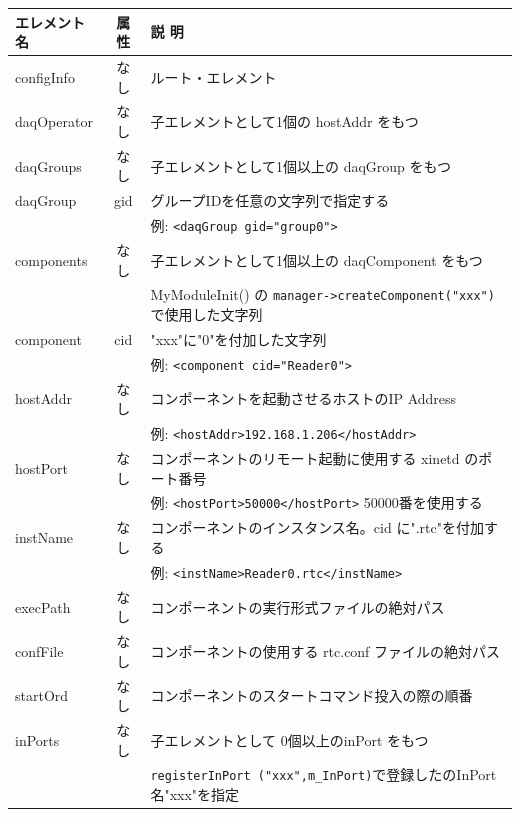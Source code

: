 \documentclass[a4j,10pt,dvips,onecolumn,oneside,final]{jarticle}%
\begin{document}
\begin{table}[htbp]
\begin{center}
{\footnotesize
    \begin{tabular}{|l|c|l|}\hline
      エレメント名 & 属 性 & 説 明\\ \hline %
      configInfo  &  なし & ルート・エレメント\\ \hline
      daqOperator &  なし & 子エレメントとして1個の hostAddr をもつ\\ \hline
      daqGroups   &  なし & 子エレメントとして1個以上の daqGroup をもつ\\ \hline
      daqGroup    &  gid  & グループIDを任意の文字列で指定する\\ 
                  &       & 例: \verb|<daqGroup gid="group0">|          \\ \hline
      components  &  なし & 子エレメントとして1個以上の daqComponent をもつ\\ \hline
                  &       & MyModuleInit() の \verb|manager->createComponent("xxx")|で使用した文字列\\
      component   &  cid  & "xxx"に"0"を付加した文字列\\ 
                  &       & 例: \verb|<component cid="Reader0">|\\ \hline
      hostAddr    &  なし & コンポーネントを起動させるホストのIP Address\\
                  &       & 例: \verb|<hostAddr>192.168.1.206</hostAddr>|\\ \hline
      hostPort    &  なし & コンポーネントのリモート起動に使用する xinetd のポート番号 \\ 
                  &       & 例: \verb|<hostPort>50000</hostPort>| 50000番を使用する\\ \hline
      instName    &  なし & コンポーネントのインスタンス名。cid に".rtc"を付加する\\
                  &       & 例:  \verb|<instName>Reader0.rtc</instName>| \\ \hline
      execPath    &  なし & コンポーネントの実行形式ファイルの絶対パス\\ \hline
      confFile    &  なし & コンポーネントの使用する rtc.conf ファイルの絶対パス\\ \hline
      startOrd    &  なし & コンポーネントのスタートコマンド投入の際の順番\\ \hline
      inPorts     &  なし & 子エレメントとして 0個以上のinPort をもつ\\ \hline
                  &       & \verb|registerInPort ("xxx",m_InPort)|で登録したのInPort名"xxx"を指定\\

\end{tabular}}
\end{center}
\end{table}
\end{document}
